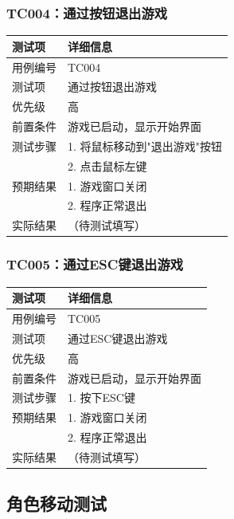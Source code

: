 \documentclass[a4paper,12pt]{article}
\begin{document}
\subsubsection{TC004：通过按钮退出游戏}
\begin{table}[h]
\centering
\begin{tabular}{ll}
\toprule
测试项 & 详细信息 \\
\midrule
用例编号 & TC004 \\
测试项 & 通过按钮退出游戏 \\
优先级 & 高 \\
前置条件 & 游戏已启动，显示开始界面 \\
测试步骤 & 1. 将鼠标移动到"退出游戏"按钮 \\
 & 2. 点击鼠标左键 \\
预期结果 & 1. 游戏窗口关闭 \\
 & 2. 程序正常退出 \\
实际结果 & （待测试填写） \\
\bottomrule
\end{tabular}
\end{table}

\subsubsection{TC005：通过ESC键退出游戏}
\begin{table}[h]
\centering
\begin{tabular}{ll}
\toprule
测试项 & 详细信息 \\
\midrule
用例编号 & TC005 \\
测试项 & 通过ESC键退出游戏 \\
优先级 & 高 \\
前置条件 & 游戏已启动，显示开始界面 \\
测试步骤 & 1. 按下ESC键 \\
预期结果 & 1. 游戏窗口关闭 \\
 & 2. 程序正常退出 \\
实际结果 & （待测试填写） \\
\bottomrule
\end{tabular}
\end{table}

\subsection{角色移动测试}
\end{document}
